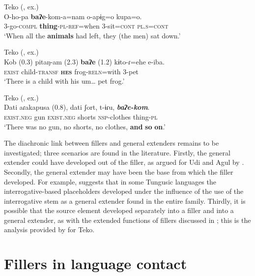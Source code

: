 \documentclass[output=paper]{langscibook}
\begin{document}
\ea\label{ex:intro:22}
{Teko (\citealt[\pageref{ex:rose:4}]{chapters/rose}, ex.)}\\
\gll O-ho-pa  \textbf{baʔe}-kom-a=nam  o-apɨg=o  kupa=o.\\
    3-go-\textsc{compl}  \textbf{thing}-\textsc{pl}{}-\textsc{ref}=when  3-sit=\textsc{cont}  \textsc{pl}.\textsc{s}=\textsc{cont}\\
\glt ‘When all the \textbf{animals} had left, they (the men) sat down.’ 
\z 

\ea\label{ex:intro:23}
{Teko (\citealt[\pageref{ex:rose:30}]{chapters/rose}, ex.)}\\
\gll Kob (0.3) pitaŋ-am (2.3)  \textbf{baʔe} (1.2)  kɨto-ɾ=ehe  e-iba.\\
    \textsc{exist} {} child-\textsc{transf} {} \textbf{\textsc{hes}} {} frog-\textsc{reln}=with  3-pet\\
\glt ‘There is a child with his um… pet frog.’ 
\z 

\ea\label{ex:intro:24}
{Teko (\citealt[\pageref{ex:rose:36}]{chapters/rose}, ex.)}\\
\gll Dati  aɾakapusa (0.8),   dati  ʃort,   t-ɨɾu, \textbf{\textit{baʔe-kom}}.\\ 
    \textsc{exist.neg} gun {} \textsc{exist.neg} shorts \textsc{nsp}-clothes thing-\textsc{pl}\\
\glt ‘There was no gun, no shorts, no clothes, \textbf{and} \textbf{so} \textbf{on}.’ 
\z 

The diachronic link between fillers and general extenders remains to be investigated; three scenarios are found in the literature. Firstly, the general extender could have developed out of the filler, as argued for Udi and Agul by \citet[111--114]{Ganenkov2010}. Secondly, the general extender may have been the base from which the filler developed. For example, \citet{chapters/klyachko} suggests that in some Tungusic languages the interrogative-based placeholders developed under the influence of the use of the interrogative stem as a general extender found in the entire family. Thirdly, it is possible that the source element developed separately into a filler and into a general extender, as with the extended functions of fillers discussed in ; this is the analysis provided by \citet{chapters/rose} for Teko.

\section{Fillers in language contact}\label{sec:intro:7}
\end{document}
